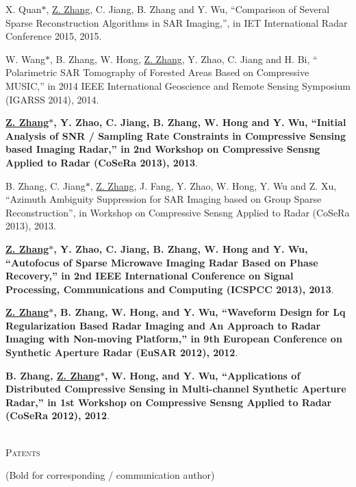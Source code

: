 \documentclass[paper=a4,fontsize=11pt]{scrartcl}
\begin{document}
\begin{description}
\item X. Quan$\ast$, \underline{Z. Zhang}, C. Jiang, B. Zhang and Y. Wu, ``Comparison of Several Sparse Reconstruction Algorithms in SAR Imaging,'', in IET International Radar Conference 2015, 2015.

\item W. Wang$\ast$, B. Zhang, W. Hong, \underline{Z. Zhang}, Y. Zhao, C. Jiang and H. Bi, `` Polarimetric SAR Tomography of Forested Areas Based on Compressive MUSIC,'' in 2014 IEEE International Geoscience and Remote Sensing Symposium (IGARSS 2014), 2014.
	
\item \textbf{\underline{Z. Zhang$\ast$}, Y. Zhao, C. Jiang, B. Zhang, W. Hong and Y. Wu, ``Initial Analysis of SNR / Sampling Rate Constraints in Compressive Sensing based Imaging Radar,'' in 2nd Workshop on Compressive Sensng Applied to Radar (CoSeRa 2013), 2013}.

\item B. Zhang, C. Jiang$\ast$, \underline{Z. Zhang}, J. Fang, Y. Zhao, W. Hong, Y. Wu and Z. Xu, ``Azimuth Ambiguity Suppression for SAR Imaging based on Group Sparse Reconstruction'', in Workshop on Compressive Sensng Applied to Radar (CoSeRa 2013), 2013.
	
\item \textbf{\underline{Z. Zhang$\ast$}, Y. Zhao, C. Jiang, B. Zhang, W. Hong and Y. Wu, ``Autofocus of Sparse Microwave Imaging Radar Based on Phase Recovery,'' in 2nd IEEE International Conference on Signal Processing, Communications and Computing (ICSPCC 2013), 2013}.

\item \textbf{\underline{Z. Zhang$\ast$}, B. Zhang, W. Hong, and Y. Wu, ``Waveform Design for Lq Regularization Based Radar Imaging and An Approach to Radar Imaging with Non-moving Platform,'' in 9th European Conference on Synthetic Aperture Radar (EuSAR 2012), 2012}.

\item \textbf{B. Zhang, \underline{Z. Zhang$\ast$}, W. Hong, and Y. Wu, ``Applications of Distributed Compressive Sensing in Multi-channel Synthetic Aperture Radar,'' in 1st Workshop on Compressive Sensng Applied to Radar (CoSeRa 2012), 2012}.

\end{description}

~\\

\textsc{Patents}

(Bold for corresponding / communication author)
\end{document}
